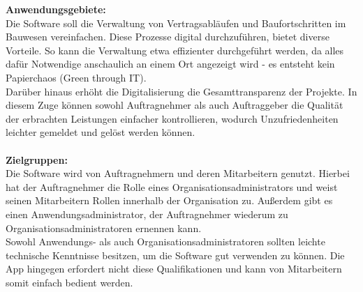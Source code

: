 %

\textbf{Anwendungsgebiete:}\\
Die Software soll die Verwaltung von Vertragsabläufen und Baufortschritten im Bauwesen vereinfachen.
Diese Prozesse digital durchzuführen, bietet diverse Vorteile.
So kann die Verwaltung etwa effizienter durchgeführt werden, da alles dafür Notwendige anschaulich an einem Ort angezeigt wird - es entsteht kein Papierchaos (Green through IT).\\
Darüber hinaus erhöht die Digitalisierung die Gesamttransparenz der Projekte.
In diesem Zuge können sowohl Auftragnehmer als auch Auftraggeber die Qualität der erbrachten Leistungen einfacher kontrollieren, wodurch Unzufriedenheiten leichter gemeldet und gelöst werden können.\\\\

\noindent \textbf{Zielgruppen:}\\
Die Software wird von Auftragnehmern und deren Mitarbeitern genutzt.
Hierbei hat der Auftragnehmer die Rolle eines Organisationsadministrators und weist seinen Mitarbeitern Rollen innerhalb der Organisation zu.
Außerdem gibt es einen Anwendungsadministrator, der Auftragnehmer wiederum zu Organisationsadministratoren ernennen kann.\\
Sowohl Anwendungs- als auch Organisationsadministratoren sollten leichte technische Kenntnisse besitzen, um die Software gut verwenden zu können.
Die App hingegen erfordert nicht diese Qualifikationen und kann von Mitarbeitern somit einfach bedient werden.
